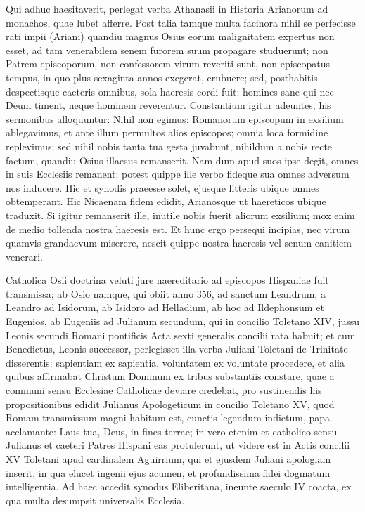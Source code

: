 \documentclass[letter,11pt]{book}
\begin{document}
Qui adhuc haesitaverit, perlegat verba Athanasii in Historia Arianorum ad monachos, quae lubet afferre. Post talia tamque multa facinora nihil se perfecisse rati impii (Ariani) quandiu magnus Osius eorum malignitatem expertus non esset, ad tam venerabilem senem furorem suum propagare studuerunt; non Patrem episcoporum, non confessorem virum reveriti sunt, non episcopatus tempus, in quo plus sexaginta annos exegerat, erubuere; sed, posthabitis despectisque caeteris omnibus, sola haeresis cordi fuit: homines sane qui nec Deum timent, neque hominem reverentur. Constantium igitur adeuntes, his sermonibus alloquuntur: Nihil non egimus: Romanorum episcopum in exsilium ablegavimus, et ante illum permultos alios episcopos; omnia loca formidine replevimus; sed nihil nobis tanta tua gesta juvabunt, nihildum a nobis recte factum, quandiu Osius illaesus remanserit. Nam dum apud suos ipse degit, omnes in suis Ecclesiis remanent; potest quippe ille verbo fideque sua omnes adversum nos inducere. Hic et synodis praeesse solet, ejusque litteris ubique omnes obtemperant. Hic Nicaenam fidem edidit, Arianosque ut haereticos ubique traduxit. Si igitur remanserit ille, inutile nobis fuerit aliorum exsilium; mox enim de medio tollenda nostra haeresis est. Et hunc ergo persequi incipias, nec virum quamvis grandaevum miserere, nescit quippe nostra haeresis vel senum canitiem venerari.

Catholica Osii doctrina veluti jure naereditario ad episcopos Hispaniae fuit transmissa; ab Osio namque, qui obiit anno 356, ad sanctum Leandrum, a Leandro ad Isidorum, ab Isidoro ad Helladium, ab hoc ad Ildephonsum et Eugenios, ab Eugeniis ad Julianum secundum, qui in concilio Toletano XIV, jussu Leonis secundi Romani pontificis Acta sexti generalis concilii rata habuit; et cum Benedictus, Leonis successor, perlegisset illa verba Juliani Toletani de Trinitate disserentis: sapientiam ex sapientia, voluntatem ex voluntate procedere, et alia quibus affirmabat Christum Dominum ex tribus substantiis constare, quae a communi sensu Ecclesiae Catholicae deviare credebat, pro sustinendis his propositionibus edidit Julianus Apologeticum in concilio Toletano XV, quod Romam transmissum magni habitum est, cunctis legendum indictum, papa acclamante: Laus tua, Deus, in fines terrae; in vero etenim et catholico sensu Julianus et caeteri Patres Hispani eas protulerunt, ut videre est in Actis concilii XV Toletani apud cardinalem Aguirrium, qui et ejusdem Juliani apologiam inserit, in qua elucet ingenii ejus acumen, et profundissima fidei dogmatum intelligentia. Ad haec accedit synodus Eliberitana, ineunte saeculo IV coacta, ex qua multa desumpsit universalis Ecclesia.
\end{document}
